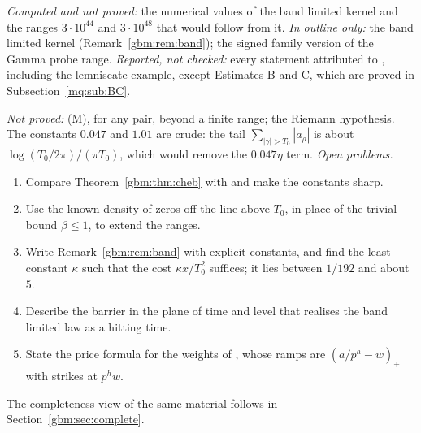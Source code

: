 \emph{Computed and not proved:} the numerical values of the band limited kernel and the ranges $3\cdot10^{44}$ and $3\cdot10^{48}$ that would follow from it. \emph{In outline only:} the band limited kernel (Remark~\ref{gbm:rem:band}); the signed family version of the Gamma probe range. \emph{Reported, not checked:} every statement attributed to \cite{Rub26}, including the lemniscate example, except Estimates B and C, which are proved in Subsection~\ref{mq:sub:BC}.

\emph{Not proved:} (M), for any pair, beyond a finite range; the Riemann hypothesis. The constants $0.047$ and $1.01$ are crude: the tail $\sum_{|\gamma|>T_0}|a_\rho|$ is about $\log(T_0/2\pi)/(\pi T_0)$, which would remove the $0.047\eta$ term.
\emph{Open problems.}
\begin{enumerate}
\item Compare Theorem~\ref{gbm:thm:cheb} with \cite{Buthe16,Buthe18} and make the constants sharp.
\item Use the known density of zeros off the line above $T_0$, in place of the trivial bound $\beta\le1$, to extend the ranges.
\item Write Remark~\ref{gbm:rem:band} with explicit constants, and find the least constant $\kappa$ such that the cost $\kappa x/T_0^2$ suffices; it lies between $1/192$ and about $5$.
\item Describe the barrier in the plane of time and level that realises the band limited law as a hitting time.
\item State the price formula for the weights of \cite{Rub26}, whose ramps are $(a/p^h-w)_+$ with strikes at $p^hw$.
\end{enumerate}

The completeness view of the same material follows in Section~\ref{gbm:sec:complete}.
